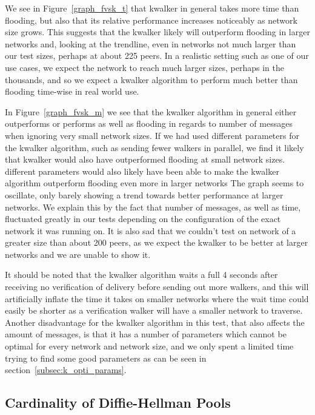 We see in Figure~\ref{graph_fvsk_t} that kwalker in general takes more time than flooding, but also that its relative performance increases noticeably as network size grows. This suggests that the kwalker likely will outperform flooding in larger networks and, looking at the trendline, even in networks not much larger than our test sizes, perhaps at about 225 peers. In a realistic setting such as one of our use cases, we expect the network to reach much larger sizes, perhaps in the thousands, and so we expect a kwalker algorithm to perform much better than flooding time-wise in real world use.

In Figure~\ref{graph_fvsk_m} we see that the kwalker algorithm in general either outperforms or performs as well as flooding in regards to number of messages when ignoring very small network sizes.
If we had used different parameters for the kwalker algorithm, such as sending fewer walkers in parallel, we find it likely that kwalker would also have outperformed flooding at small network sizes. different parameters would also likely have been able to make the kwalker algorithm outperform flooding even more in larger networks
The graph seems to oscillate, only barely showing a trend towards better performance at larger networks. We explain this by the fact that number of messages, as well as time, fluctuated greatly in our tests depending on the configuration of the exact network it was running on. It is also sad that we couldn't test on network of a greater size than about 200 peers, as we expect the kwalker to be better at larger networks and we are unable to show it.

It should be noted that the kwalker algorithm waits a full 4 seconds after receiving no verification of delivery before sending out more walkers, and this will artificially inflate the time it takes on smaller networks where the wait time could easily be shorter as a verification walker will have a smaller network to traverse. Another disadvantage for the kwalker algorithm in this test, that also affects the amount of messages, is that it has a number of parameters which cannot be optimal for every network and network size, and we only spent a limited time trying to find some good parameters as can be seen in section~\ref{subsec:k_opti_params}.

\subsection{Cardinality of Diffie-Hellman Pools}

